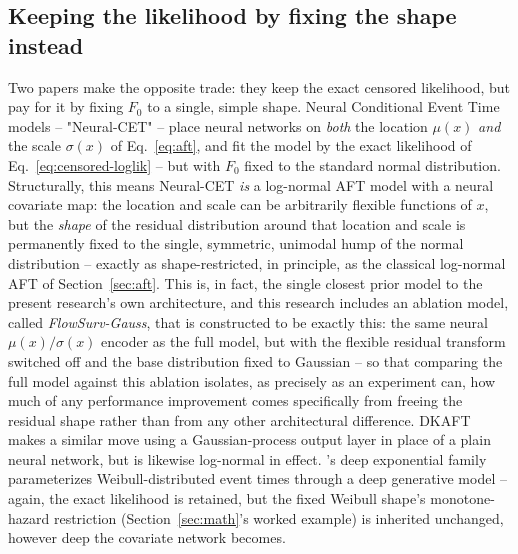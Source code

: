 \documentclass[11pt]{article}
\begin{document}
\subsection{Keeping the likelihood by fixing the shape instead}
Two papers make the opposite trade: they keep the exact censored
likelihood, but pay for it by fixing $F_0$ to a single, simple shape.
Neural Conditional Event Time models \citep{engelhard2020neuralcet} --
"Neural-CET" -- place neural networks on \emph{both} the location $\mu(x)$
\emph{and} the scale $\sigma(x)$ of Eq.~\eqref{eq:aft}, and fit the model
by the exact likelihood of Eq.~\eqref{eq:censored-loglik} -- but with
$F_0$ fixed to the standard normal distribution. Structurally, this
means Neural-CET \emph{is} a log-normal AFT model with a neural covariate
map: the location and scale can be arbitrarily flexible functions of
$x$, but the \emph{shape} of the residual distribution around that
location and scale is permanently fixed to the single, symmetric,
unimodal hump of the normal distribution -- exactly as shape-restricted,
in principle, as the classical log-normal AFT of Section~\ref{sec:aft}.
This is, in fact, the single closest prior model to the present
research's own architecture, and this research includes an ablation
model, called \emph{FlowSurv-Gauss}, that is constructed to be exactly
this: the same neural $\mu(x)/\sigma(x)$ encoder as the full model, but
with the flexible residual transform switched off and the base
distribution fixed to Gaussian -- so that comparing the full model
against this ablation isolates, as precisely as an experiment can, how
much of any performance improvement comes specifically from freeing the
residual shape rather than from any other architectural difference. DKAFT
\citep{wu2021dkaft} makes a similar move using a Gaussian-process output
layer in place of a plain neural network, but is likewise log-normal in
effect. \citet{ranganath2016deepsurv}'s deep exponential family
parameterizes Weibull-distributed event times through a deep generative
model -- again, the exact likelihood is retained, but the fixed Weibull
shape's monotone-hazard restriction (Section~\ref{sec:math}'s worked
example) is inherited unchanged, however deep the covariate network
becomes.
\end{document}
